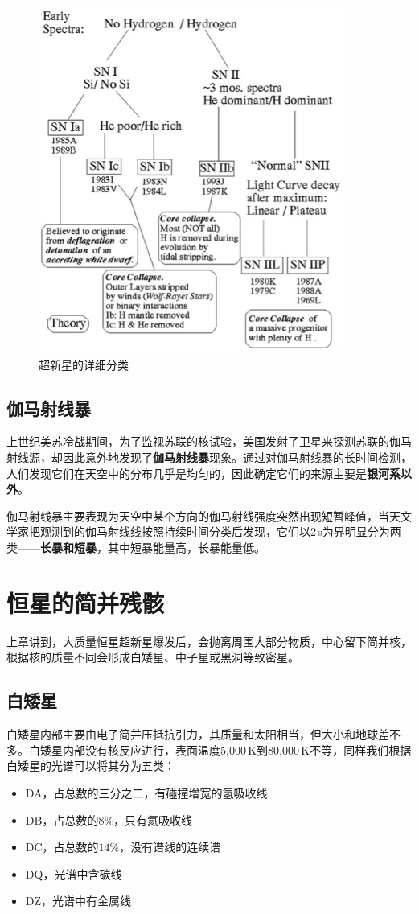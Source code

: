 \documentclass[openany]{ctexbook}
\begin{document}
\begin{figure}[hbt]
  \centering
  \includegraphics[width=10cm]{chapters/15/supernova}
  \caption{超新星的详细分类}
  \label{fig:supernova}
\end{figure}

\section{伽马射线暴}
上世纪美苏冷战期间，为了监视苏联的核试验，美国发射了卫星来探测苏联的伽马射线源，却因此意外地发现了\textbf{伽马射线暴}现象。通过对伽马射线暴的长时间检测，人们发现它们在天空中的分布几乎是均匀的，因此确定它们的来源主要是\textbf{银河系以外}。

伽马射线暴主要表现为天空中某个方向的伽马射线强度突然出现短暂峰值，当天文学家把观测到的伽马射线线按照持续时间分类后发现，它们以2\,s为界明显分为两类——\textbf{长暴和短暴}，其中短暴能量高，长暴能量低。

\chapter{恒星的简并残骸}
上章讲到，大质量恒星超新星爆发后，会抛离周围大部分物质，中心留下简并核，根据核的质量不同会形成白矮星、中子星或黑洞等致密星。

\section{白矮星}
白矮星内部主要由电子简并压抵抗引力，其质量和太阳相当，但大小和地球差不多。白矮星内部没有核反应进行，表面温度5,000\,K到80,000\,K不等，同样我们根据白矮星的光谱可以将其分为五类：
\begin{itemize}
  \item DA，占总数的三分之二，有碰撞增宽的氢吸收线
  \item DB，占总数的$8\%$，只有氦吸收线
  \item DC，占总数的$14\%$，没有谱线的连续谱
  \item DQ，光谱中含碳线
  \item DZ，光谱中有金属线
\end{itemize}
\end{document}
